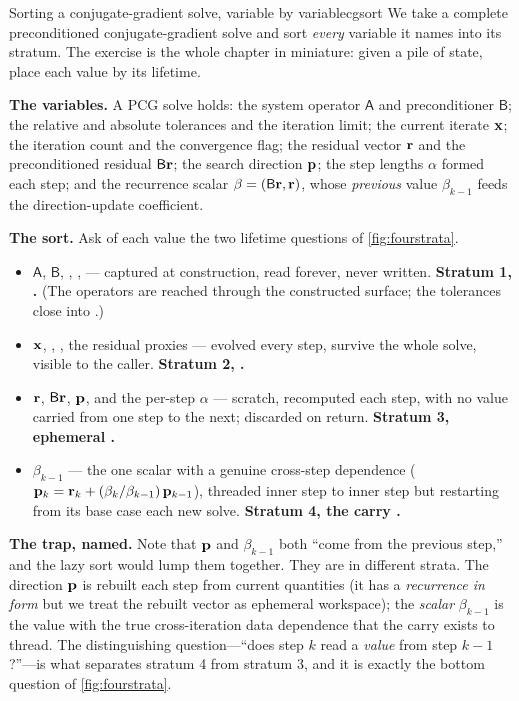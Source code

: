 \begin{workedexample}{Sorting a conjugate-gradient solve, variable by variable}{cgsort}
We take a complete preconditioned conjugate-gradient solve and sort
\emph{every} variable it names into its stratum. The exercise is the whole
chapter in miniature: given a pile of state, place each value by its lifetime.

\textbf{The variables.} A PCG solve holds: the system operator $\mathsf{A}$ and
preconditioner $\mathsf{B}$; the relative and absolute tolerances and the
iteration limit; the current iterate $\mathbf{x}$; the iteration count and the
convergence flag; the residual vector $\mathbf{r}$ and the preconditioned residual
$\mathsf{B}\mathbf{r}$; the search direction $\mathbf{p}$; the step lengths $\alpha$ formed
each step; and the recurrence scalar $\beta = (\mathsf{B}\mathbf{r},\mathbf{r})$, whose
\emph{previous} value $\beta_{k-1}$ feeds the direction-update coefficient.

\tcblower
\textbf{The sort.} Ask of each value the two lifetime questions of
\cref{fig:fourstrata}.

\begin{itemize}[nosep]
  \item \(\mathsf{A}\), \(\mathsf{B}\), , ,
   --- captured at construction, read forever, never written.
  \textbf{Stratum 1, .} (The operators are reached through the
  constructed  surface; the tolerances close into .)
  \item \(\mathbf{x}\), , , the residual proxies --- evolved
  every step, survive the whole solve, visible to the caller.
  \textbf{Stratum 2, .}
  \item \(\mathbf{r}\), \(\mathsf{B}\mathbf{r}\), \(\mathbf{p}\), and the per-step \(\alpha\) ---
  scratch, recomputed each step, with no value carried from one step to the next;
  discarded on return. \textbf{Stratum 3, ephemeral .}
  \item \(\beta_{k-1}\) --- the one scalar with a genuine cross-step dependence
  (\(\mathbf{p}_k = \mathbf{r}_k + (\beta_k/\beta_{k-1})\,\mathbf{p}_{k-1}\)), threaded inner step to
  inner step but restarting from its base case each new solve.
  \textbf{Stratum 4, the carry .}
\end{itemize}

\textbf{The trap, named.} Note that $\mathbf{p}$ and $\beta_{k-1}$ both ``come from the
previous step,'' and the lazy sort would lump them together. They are in
different strata. The direction $\mathbf{p}$ is rebuilt each step from current
quantities (it has a \emph{recurrence in form} but we treat the rebuilt vector as
ephemeral workspace); the \emph{scalar} $\beta_{k-1}$ is the value with the true
cross-iteration data dependence that the carry exists to thread. The
distinguishing question---``does step $k$ read a \emph{value} from step
$k-1$?''---is what separates stratum 4 from stratum 3, and it is exactly the
bottom question of \cref{fig:fourstrata}.
\end{workedexample}

